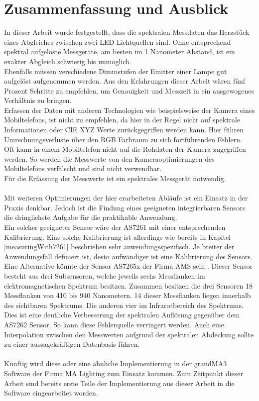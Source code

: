 \documentclass[11pt]{scrartcl}
\begin{document}
\section{Zusammenfassung und Ausblick}
In dieser Arbeit wurde festgestellt, dass die spektralen Messdaten das Herzstück eines Abgleiches zwischen
zwei LED Lichtquellen sind. Ohne entsprechend spektral aufgelöste Messgeräte, am besten im 1 Nanometer Abstand,
ist ein exakter Abgleich schwierig bis unmöglich.\\
Ebenfalls müssen verschiedene Dimmstufen der Emitter einer Lampe gut aufgelöst aufgenommen werden. Aus den
Erfahrungen dieser Arbeit wären fünf Prozent Schritte zu empfehlen, um Genauigkeit und Messzeit in ein ausgewogenes
Verhältnis zu bringen.\\
Erfassen der Daten mit anderen Technologien wie beispielsweise der Kamera eines Mobiltelefons, ist nicht zu
empfehlen, da hier in der Regel nicht auf spektrale Informationen oder CIE XYZ Werte zurückgegriffen werden kann.
Hier führen Umrechnungsverluste über den RGB Farbraum zu sich fortführenden Fehlern.\\
Oft kann in einem Mobiltelefon nicht auf die Rohdaten der Kamera zugegriffen werden. So werden die Messwerte von
den Kameraoptimierungen des Mobiltelefons verfälscht und sind nicht verwendbar.\\
Für die Erfassung der Messwerte ist ein spektrales Messgerät notwendig.\\
\\
Mit weiteren Optimierungen der hier erarbeiteten Abläufe ist ein Einsatz in der Praxis denkbar. Jedoch ist die
Findung eines geeigneten integrierbaren Sensors die dringlichste Aufgabe für die praktikable Anwendung.\\
Ein solcher geeigneter Sensor wäre der AS7261 mit einer entsprechenden Kalibrierung. Eine solche Kalibrierung ist
allerdings wie bereits in Kapitel \ref{measuringWith7261} beschrieben sehr anwendungsspezifisch. Je breiter der
Anwendungsfall definiert ist, desto aufwändiger ist eine Kalibrierung des Sensors.\\
Eine Alternative könnte der Sensor AS7265x der Firma AMS sein \cite{datasheet65}. Dieser Sensor besteht aus drei
Subsensoren, welche jeweils sechs Messflanken im elektromagnetischen Spektrum besitzen. Zusammen besitzen die drei
Sensoren 18 Messflanken von 410 bis 940 Nanometern. 14 dieser Messflanken liegen innerhalb des sichtbaren Spektrums.
Die anderen vier im Infrarotbereich des Spektrums.\\
Dies ist eine deutliche Verbesserung der spektralen Auflösung gegenüber dem AS7262 Sensor. So kann diese Fehlerquelle
verringert werden. Auch eine Interpolation zwischen den Messwerten aufgrund der spektralen Abdeckung sollte zu einer
aussagekräftigen Datenbasis führen.\\
\\
Künftig wird diese oder eine ähnliche Implementierung in der grandMA3 Software der Firma MA Lighting zum Einsatz kommen.
Zum Zeitpunkt dieser Arbeit sind bereits erste Teile der Implementierung aus dieser Arbeit in die Software
eingearbeitet worden.
\clearpage
\end{document}
